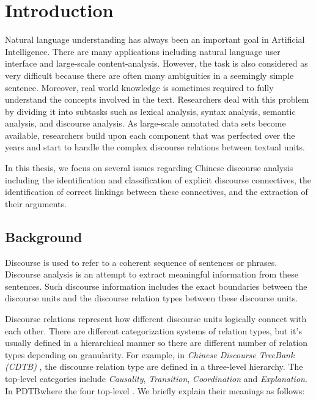 %
%
%
\chapter{Introduction}
\label{c:intro}

Natural language understanding has always been an important goal in Artificial
Intelligence. There are many applications including natural language user
interface and large-scale content-analysis. However, the task is also considered
as very difficult because there are often many ambiguities in a seemingly
simple sentence. Moreover, real world knowledge is sometimes required to fully
understand the concepts involved in the text. Researchers deal with this problem by dividing it into subtasks such as lexical
analysis, syntax analysis, semantic analysis, and discourse analysis.
As large-scale annotated data sets become available, researchers build
upon each component that was perfected over the years and start to handle the
complex discourse relations between textual units.

In this thesis, we focus on several issues regarding Chinese discourse analysis
including the identification and classification of explicit discourse connectives,
the identification of correct linkings between these connectives, and the extraction
of their arguments. 

%
%
\section{Background}

Discourse is used to refer to a coherent sequence of sentences or phrases.
Discourse analysis is an attempt to extract meaningful information from
these sentences. Such discourse information includes the exact boundaries
between the discourse units and the discourse relation types between
these discourse units.

Discourse relations represent how different discourse units logically connect
with each other.  There are different categorization systems of relation types, but
it's usually defined in a hierarchical manner so there are different number
of relation types depending on granularity. For example, in
\textit{Chinese Discourse TreeBank (CDTB)} \citep{li2014building}, the discourse
relation type are defined in a three-level hierarchy. The top-level categories
include \textit{Causality}, \textit{Transition}, \textit{Coordination}
and \textit{Explanation}. In PDTBwhere the four top-level . We briefly explain their meanings as follows:

